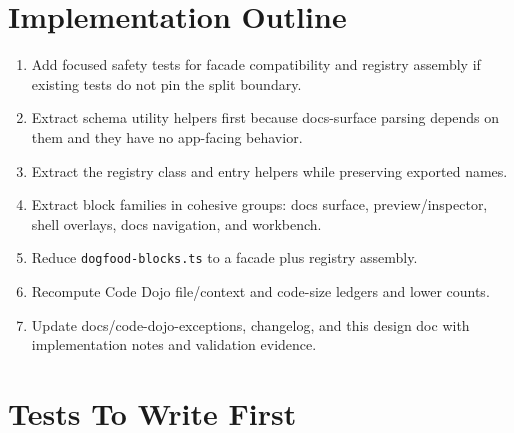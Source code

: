 \section{Implementation Outline}\label{record-253-implementation-outline}

\begin{enumerate}
\def\labelenumi{\arabic{enumi}.}
\tightlist
\item
  Add focused safety tests for facade compatibility and registry assembly if existing tests do not pin the split boundary.
\item
  Extract schema utility helpers first because docs-surface parsing depends on them and they have no app-facing behavior.
\item
  Extract the registry class and entry helpers while preserving exported names.
\item
  Extract block families in cohesive groups: docs surface, preview/inspector, shell overlays, docs navigation, and workbench.
\item
  Reduce \texttt{d\allowbreak{}o\allowbreak{}g\allowbreak{}f\allowbreak{}o\allowbreak{}o\allowbreak{}d\allowbreak{}-\allowbreak{}b\allowbreak{}l\allowbreak{}o\allowbreak{}c\allowbreak{}k\allowbreak{}s\allowbreak{}.\allowbreak{}t\allowbreak{}s} to a facade plus registry assembly.
\item
  Recompute Code Dojo file/context and code-size ledgers and lower counts.
\item
  Update docs/code-dojo-exceptions, changelog, and this design doc with implementation notes and validation evidence.
\end{enumerate}

\section{Tests To Write First}\label{record-253-tests-to-write-first}

